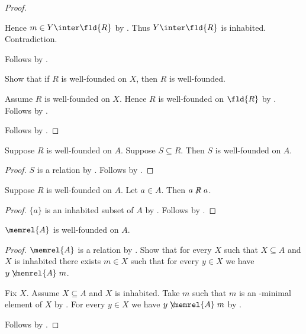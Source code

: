 \begin{proof}
\begin{subproof}
\begin{subproof}
\begin{subproof}
\begin{subproof}
                    Hence $m\in Y\inter\fld{R}$ by .
                    Thus $Y\inter\fld{R}$ is inhabited.
                    Contradiction.
                \end{subproof}
            \end{subproof}
        \end{subproof}
        Follows by .
    \end{subproof}
    Show that if $R$ is well-founded on $X$, then $R$ is well-founded.
    \begin{subproof}
        Assume $R$ is well-founded on $X$.
        Hence $R$ is well-founded on $\fld{R}$
            by .
        Follows by .
    \end{subproof}
    Follows by \auto.
\end{proof}

\begin{proposition}\label{well_founded_on_subset_relation}
    Suppose $R$ is well-founded on $A$.
    Suppose $S\subseteq R$.
    Then $S$ is well-founded on $A$.
\end{proposition}
\begin{proof}
    $S$ is a relation by .
    Follows by .
\end{proof}

\begin{proposition}\label{well_founded_on_irreflexive}
    Suppose $R$ is well-founded on $A$.
    Let $a\in A$.
    Then $a\not\mathrel{R}a$.
\end{proposition}
\begin{proof}
    $\{a\}$ is an inhabited subset of $A$
        by .
    Follows by .
\end{proof}

\begin{proposition}\label{membership_is_well_founded_on}
    $\memrel{A}$ is well-founded on $A$.
\end{proposition}
\begin{proof}
    $\memrel{A}$ is a relation by .
    Show that for every $X$ such that $X\subseteq A$ and $X$ is inhabited
        there exists $m\in X$ such that for every $y\in X$
            we have $y\not\mathrel{\memrel{A}}m$.
    \begin{subproof}
        Fix $X$.
        Assume $X\subseteq A$ and $X$ is inhabited.
        Take $m$ such that $m$ is an \in-minimal element of $X$
            by .
        For every $y\in X$ we have $y\not\mathrel{\memrel{A}}m$
            by .
    \end{subproof}
    Follows by .
\end{proof}
